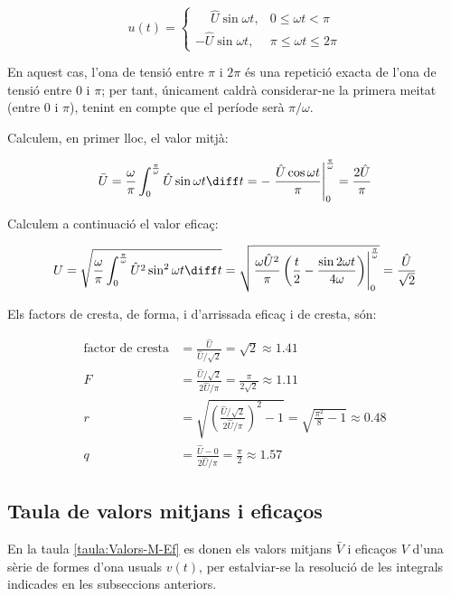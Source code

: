 \begin{exemple}[\FactorsCrestaFormaArr{}]
    \[
    u(t) = \begin{cases} \phantom{-}\hat{U} \sin\omega t, & 0 \leq \omega t < \pi\\
           -\hat{U} \sin\omega t, & \pi \leq \omega t \leq 2\pi \end{cases}
    \]

    En aquest cas, l'ona de tensió entre $\pi$ i $2\pi$ és una repetició
    exacta de l'ona de tensió entre 0 i $\pi$; per tant, únicament
    caldrà considerar-ne la primera meitat (entre 0 i $\pi$), tenint en
    compte que el període serà $\pi/\omega$.

     Calculem, en primer lloc, el valor mitjà:
     
     \[
    \bar{U} = \frac{\omega}{\pi} \int_0^\frac{\pi}{\omega} \hat{U}
    \sin\omega t \diff t  = - \left. \frac{\hat{U} \cos\omega t}{\pi}
    \right|_0^\frac{\pi}{\omega} = \frac{2 \hat{U}}{\pi}
    \]

    Calculem a continuació el valor eficaç:
    
    \[
    U = \sqrt{\frac{\omega}{\pi} \int_0^\frac{\pi}{\omega} \hat{U}^2
    \sin^2\omega t \diff t } =   \sqrt{\left.\frac{\omega
    \hat{U}^2}{\pi}\left( \frac{t}{2} - \frac{\sin 2\omega t}{4\omega}
    \right)\right|_0^\frac{\pi}{\omega}}  = \frac{\hat{U}}{\sqrt{2}}
    \]

    Els factors de cresta, de forma, i d'arrissada eficaç i de cresta, són:
    
    \begin{align*}
        \text{factor de cresta} &= \frac{\hat{U}}{\hat{U}/\sqrt{2}} = \sqrt{2} \approx\num{1,41} \\[2ex]
        F &= \frac{\hat{U}/\sqrt{2}}{2 \hat{U}/\pi} =\frac{\pi}{2\sqrt{2}} \approx
        \num{1,11} \\[2ex]
    r &= \sqrt{\left(\frac{\hat{U}/\sqrt{2}}{2 \hat{U}/\pi}\right)^2-1}
    = \sqrt{\frac{\pi^2}{8}-1} \approx \num{0,48}\\[2ex]
    q &=  \frac{\hat{U} - 0}{2 \hat{U}/\pi} = \frac{\pi}{2} \approx \num{1,57}
    \end{align*}
\end{exemple}


\subsection{Taula de valors mitjans i eficaços}

En la taula \vref{taula:Valors-M-Ef}  es donen els valors mitjans $\bar{V}$ i eficaços $V$ d'una
sèrie de formes d'ona usuals $v(t)$, per estalviar-se la resolució de les integrals indicades en les subseccions anteriors.

